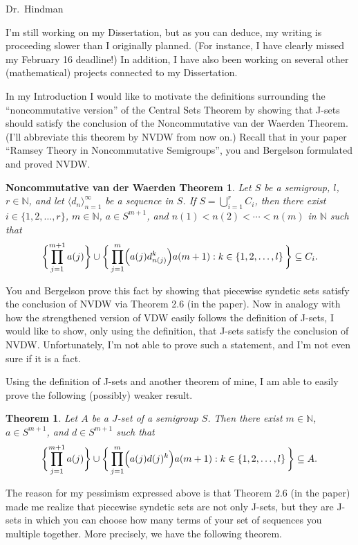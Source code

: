 \documentclass[12pt]{letter}
\date{February 17, 2011}
\theoremstyle{plain}
\newtheorem*{nvdw}{Noncommutative van der Waerden Theorem}
\newtheorem*{thm}{Theorem}
\theoremstyle{definition}
\newcommand{\la}{\langle}
\newcommand{\ra}{\rangle}
\newcommand{\bbN}{\mathbb{N}}
\begin{document}
\begin{letter}{}
\opening{Dr.~Hindman}

I'm still working on my Dissertation, but as you can deduce, my
writing is proceeding slower than I originally planned.  
(For instance, I have clearly missed my February 16 deadline!)
In addition, I have also been working on several other (mathematical)
projects connected to my Dissertation.

In my Introduction I would like to motivate the definitions
surrounding the ``noncommutative version'' of the Central Sets Theorem
by showing that J-sets should satisfy the conclusion of the
Noncommutative van der Waerden Theorem.  
(I'll abbreviate this theorem by NVDW from now on.)
Recall that in your paper ``Ramsey Theory in Noncommutative
Semigroups'', you and Bergelson formulated and proved NVDW.

\begin{nvdw}
  Let $S$ be a semigroup, $l$, $r \in \bbN$, and let $\la d_n
  \ra_{n=1}^\infty$ be a sequence in $S$. 
  If $S = \bigcup_{i=1}^r C_i$, then there exist $i \in \{1, 2,
  \ldots, r\}$, $m \in \bbN$, $a \in S^{m+1}$, and $n(1) < n(2) <
  \cdots < n(m)$ in $\bbN$ such that 
  \[
    \biggl\{ \prod_{j=1}^{m+1}a(j) \biggr\} \cup \biggl\{\,
    \prod_{j=1}^m\Bigl(a(j)d_{n(j)}^k\Bigr)a(m+1) : k \in \{1, 2, \ldots, l\}
    \,\biggr\} \subseteq C_i.
  \]
\end{nvdw}

You and Bergelson prove this fact by showing that piecewise syndetic
sets satisfy the conclusion of NVDW via Theorem 2.6 (in the paper).
Now in analogy with how the strengthened version of VDW easily follows
the definition of J-sets, I would like to show, only using the
definition, that J-sets satisfy the conclusion of NVDW.
Unfortunately, I'm not able to prove such a statement, and I'm not
even sure if it is a fact.

Using the definition of J-sets and another theorem of mine, I am able
to easily prove the following (possibly) weaker result.

\begin{thm}
  Let $A$ be a $J$-set of a semigroup $S$.
  Then there exist $m \in \bbN$, $a \in S^{m+1}$, and $d \in S^{m+1}$
  such that
  \[
    \biggl\{ \prod_{j=1}^{m+1}a(j) \biggr\} \cup \biggl\{\,
    \prod_{j=1}^m\Bigl(a(j)d(j)^k\Bigr)a(m+1) : k \in \{1, 2, \ldots, l\}
    \,\biggr\} \subseteq A.
  \]
\end{thm}

The reason for my pessimism expressed above is that Theorem 2.6 (in
the paper) made me realize that piecewise syndetic sets are not only
J-sets, but they are J-sets in which you can choose how many terms of
your set of sequences you multiple together.
More precisely, we have the following theorem.


\end{letter}
\end{document}
